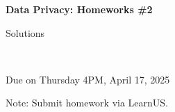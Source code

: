\documentclass[12pt]{article}
\begin{document}
\begin{center}
{\bf Data Privacy: Homeworks \#2 \begin{solution}Solutions\end{solution}}\\ \medskip
\begin{problem}Due on Thursday 4PM, April 17, 2025 \end{problem}
\end{center}

\begin{problem}
\noindent 
Note: Submit homework via LearnUS.
\end{problem}

\begin{solution}
\end{solution}
\end{document}

